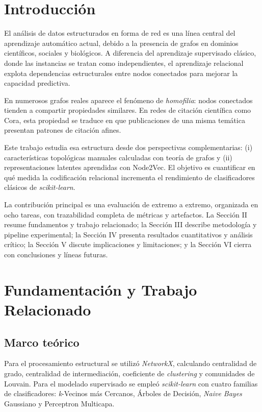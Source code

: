 \documentclass[conference,a4paper]{IEEEtran}
\begin{document}
\section{\textbf{Introducción}}

El análisis de datos estructurados en forma de red es una línea central del aprendizaje automático
actual, debido a la presencia de grafos en dominios científicos, sociales y biológicos. A diferencia
del aprendizaje supervisado clásico, donde las instancias se tratan como independientes, el aprendizaje
relacional explota dependencias estructurales entre nodos conectados para mejorar la capacidad
predictiva.

En numerosos grafos reales aparece el fenómeno de \textit{homofilia}: nodos conectados tienden a
compartir propiedades similares. En redes de citación científica como Cora, esta propiedad se traduce
en que publicaciones de una misma temática presentan patrones de citación afines.

Este trabajo estudia esa estructura desde dos perspectivas complementarias: (i) características
topológicas manuales calculadas con teoría de grafos y (ii) representaciones latentes aprendidas con
Node2Vec. El objetivo es cuantificar en qué medida la codificación relacional incrementa el rendimiento
de clasificadores clásicos de \textit{scikit-learn}.

La contribución principal es una evaluación de extremo a extremo, organizada en ocho tareas, con
trazabilidad completa de métricas y artefactos. La Sección II resume fundamentos y trabajo relacionado;
la Sección III describe metodología y pipeline experimental; la Sección IV presenta resultados
cuantitativos y análisis crítico; la Sección V discute implicaciones y limitaciones; y la Sección VI
cierra con conclusiones y líneas futuras.

\section{\textbf{Fundamentación y Trabajo Relacionado}}
\subsection{Marco teórico}

Para el procesamiento estructural se utilizó \textit{NetworkX}, calculando centralidad de grado,
centralidad de intermediación, coeficiente de \textit{clustering} y comunidades de Louvain. Para el
modelado supervisado se empleó \textit{scikit-learn} con cuatro familias de clasificadores:
\textit{k}-Vecinos más Cercanos, Árboles de Decisión, \textit{Naive Bayes} Gaussiano y Perceptron
Multicapa.
\end{document}

